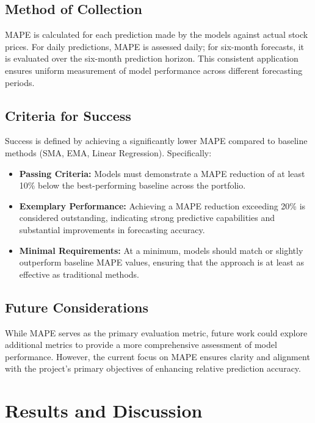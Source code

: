 \documentclass[10pt,twocolumn]{article}
\begin{document}
\subsection{Method of Collection}

MAPE is calculated for each prediction made by the models against actual stock prices. For daily predictions, MAPE is assessed daily; for six-month forecasts, it is evaluated over the six-month prediction horizon. This consistent application ensures uniform measurement of model performance across different forecasting periods.

\subsection{Criteria for Success}

Success is defined by achieving a significantly lower MAPE compared to baseline methods (SMA, EMA, Linear Regression). Specifically:

\begin{itemize}
    \item \textbf{Passing Criteria:} Models must demonstrate a MAPE reduction of at least 10\% below the best-performing baseline across the portfolio.

    \item \textbf{Exemplary Performance:} Achieving a MAPE reduction exceeding 20\% is considered outstanding, indicating strong predictive capabilities and substantial improvements in forecasting accuracy.

    \item \textbf{Minimal Requirements:} At a minimum, models should match or slightly outperform baseline MAPE values, ensuring that the approach is at least as effective as traditional methods.
\end{itemize}

\subsection{Future Considerations}

While MAPE serves as the primary evaluation metric, future work could explore additional metrics to provide a more comprehensive assessment of model performance. However, the current focus on MAPE ensures clarity and alignment with the project's primary objectives of enhancing relative prediction accuracy.

\section{Results and Discussion}
\end{document}
